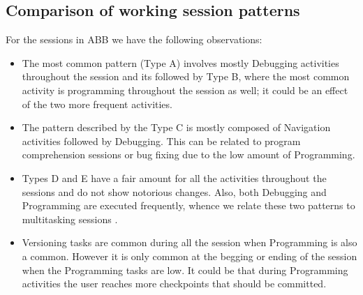 \subsection{Comparison of working session patterns}
For the sessions in ABB we have the following observations:
\begin{itemize}
	\item The most common pattern (Type A) involves mostly Debugging activities throughout the session and its followed by Type B, where the most common activity is programming throughout the session as well; it could be an effect of the two more frequent activities.
	
	\item The pattern described by the Type C is mostly composed of Navigation activities followed by Debugging. This can be related to program comprehension sessions \cite{MMLK14} or bug fixing due to the low amount of Programming.
	
	\item Types D and E have a fair amount for all the activities throughout the sessions and do not show notorious changes. Also, both Debugging and Programming are executed frequently, whence we relate these two patterns to multitasking sessions \cite{SLV10}.
	
	\item Versioning tasks are common during all the session when Programming is also a common. However it is only common at the begging or ending of the session when the Programming tasks are low. It could be that during Programming activities the user reaches more checkpoints that should be committed. 
\end{itemize}

